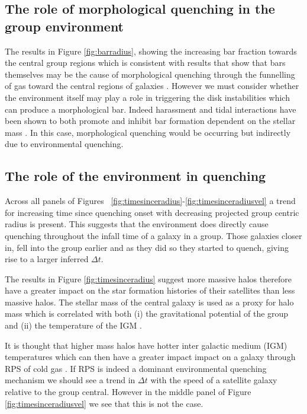 \subsection{The role of morphological quenching in the group environment}\label{sec:rolemorphenv}

The results in Figure \ref{fig:barradius}, showing the increasing bar fraction towards the central group regions which is consistent with results that show that bars themselves may be the cause of morphological quenching through the funnelling of gas toward the central regions of galaxies \citep{athanassoula92b, sheth05,masters10c}. However we must consider whether the environment itself may play a role in triggering the disk instabilities which can produce a morphological bar. Indeed harassment and tidal interactions have been shown to both promote and inhibit bar formation dependent on the stellar mass \citep{noguchi88, moore96, skibba12}.  In this case, morphological quenching would be occurring but indirectly due to environmental quenching. 

\subsection{The role of the environment in quenching}\label{sec:roleenv}

Across all panels of Figures ~\ref{fig:timesinceradius}-\ref{fig:timesinceradiusvel} a trend for increasing time since quenching onset with decreasing projected group centric radius is present. This suggests that the environment does directly cause quenching throughout the infall time of a galaxy in a group. Those galaxies closer in, fell into the group earlier and as they did so they started to quench, giving rise to a larger inferred $\Delta t$.

The results in Figure \ref{fig:timesinceradius} suggest more massive halos therefore have a greater impact on the star formation histories of their satellites than less massive halos. The stellar mass of the central galaxy is used as a proxy for halo mass which is correlated with both (i) the gravitational potential of the group \citep{ref} and (ii) the temperature of the IGM \citep{ref}.

It is thought that higher mass halos have hotter inter galactic medium (IGM) temperatures \citep{ref} which can then have a greater impact impact on a galaxy through RPS of cold gas \citep{ref}. If RPS is indeed a dominant environmental quenching mechanism we should see a trend in $\Delta t$ with the speed of a satellite galaxy relative to the group central.  However in the middle panel of Figure \ref{fig:timesinceradiusvel} we see that this is not the case. 

